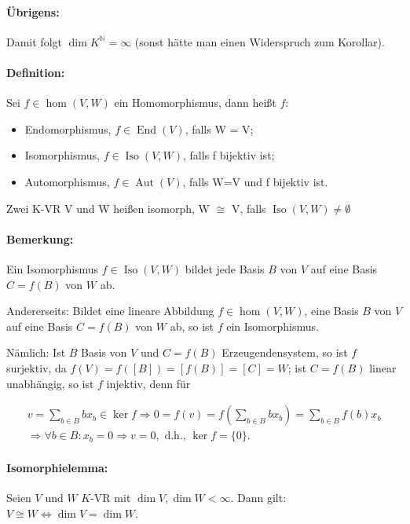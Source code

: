 \paragraph{Übrigens: }
	Damit folgt $\dim K^\mathbb{N} =\infty$ (sonst hätte man einen Widerspruch zum Korollar).
		
\paragraph{Definition: }
	Sei $f\in \hom(V,W)$ ein Homomorphismus, dann heißt $f$:
	\begin{itemize}
		\item Endomorphismus, $f\in \operatorname{End} (V)$, falls W = V;
		\item Isomorphismus, $f\in \operatorname{Iso}(V,W)$, falls f bijektiv ist;
		\item Automorphismus, $f\in \operatorname{Aut}(V)$, falls W=V und f bijektiv ist.
	\end{itemize}
	
	Zwei K-VR V und W heißen isomorph, W $\cong$ V, falls $\operatorname{Iso}(V,W) \neq \emptyset$

\paragraph{Bemerkung: }
	Ein Isomorphismus $f\in \operatorname{Iso}(V,W)$ bildet jede Basis $B$ von $V$ auf eine Basis $C = f(B)$ von $W$ ab.
	
	Andererseits: Bildet eine lineare Abbildung $f\in \hom(V,W)$, eine Basis $B$ von $V$ auf eine Basis $C = f(B)$ von $W$ ab, so ist $f$ ein Isomorphismus.
	
	Nämlich: Ist $B$ Basis von $V$ und $ C = f(B)$ Erzeugendensystem, so ist $f$ surjektiv, da $f(V) = f ([B]) = [f(B)] = [C] = W$;
	ist $C =f(B)$ linear unabhängig, so ist $f$ injektiv, denn für
			
	\begin{gather*}
		v = \sum_{b\in B} bx_b \in \ker f \Rightarrow 0 = f(v) = f(\sum_{b\in B}bx_b) = \sum_{b\in B}f(b)x_b\\
		\Rightarrow \forall b \in B: x_b = 0 \Rightarrow v = 0, \text{ d.h., } \ker f=\{{0}\}.
	\end{gather*}
			
\paragraph{Isomorphielemma: }
	Seien $V$ und $W$ $ K $-VR mit $\dim V, \dim W < \infty$.
	Dann gilt: $V \cong W \Leftrightarrow \dim V = \dim W$.
	
